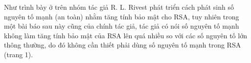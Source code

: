 Như trình bày ở trên nhóm tác giả R. L. Rivest phát triển cách phát sinh số nguyên tố mạnh (an toàn) nhằm tăng tính bảo mật cho RSA, tuy nhiên trong một bài báo sau 
này \cite{AreStrongPrimesNeedForRsa} cũng của chính tác giả, tác giả có nói số nguyên tố mạnh không làm tăng tính bảo mật của RSA lên quá nhiều so với các số 
nguyên tố lớn thông thường, do đó không cần thiết phải dùng số nguyên tố mạnh trong RSA (trang 1).